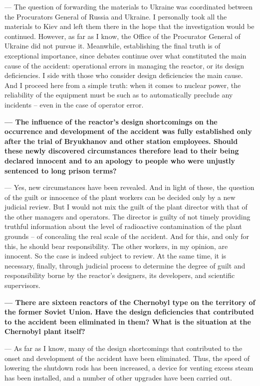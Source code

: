 \documentclass[openright]{bookest}
\begin{document}
\noindent
--- The question of forwarding the materials to Ukraine was coordinated between the Procurators General of Russia and Ukraine. I personally took all the materials to Kiev and left them there in the hope that the investigation would be continued. However, as far as I know, the Office of the Procurator General of Ukraine did not pursue it. Meanwhile, establishing the final truth is of exceptional importance, since debates continue over what constituted the main cause of the accident: operational errors in managing the reactor, or its design deficiencies. I side with those who consider design deficiencies the main cause. And I proceed here from a simple truth: when it comes to nuclear power, the reliability of the equipment must be such as to automatically preclude any incidents -- even in the case of operator error.

\medskip

\textbf{--- The influence of the reactor's design shortcomings on the occurrence and development of the accident was fully established only after the trial of Bryukhanov and other station employees. Should these newly discovered circumstances therefore lead to their being declared innocent and to an apology to people who were unjustly sentenced to long prison terms?}

\noindent
--- Yes, new circumstances have been revealed. And in light of these, the question of the guilt or innocence of the plant workers can be decided only by a new judicial review. But I would not mix the guilt of the plant director with that of the other managers and operators. The director is guilty of not timely providing truthful information about the level of radioactive contamination of the plant grounds -- of concealing the real scale of the accident. And for this, and only for this, he should bear responsibility. The other workers, in my opinion, are innocent. So the case is indeed subject to review. At the same time, it is necessary, finally, through judicial process to determine the degree of guilt and responsibility borne by the reactor's designers, its developers, and scientific supervisors. 

\medskip

\textbf{--- There are sixteen reactors of the Chernobyl type on the territory of the former Soviet Union. Have the design deficiencies that contributed to the accident been eliminated in them? What is the situation at the Chernobyl plant itself?}

\noindent
--- As far as I know, many of the design shortcomings that contributed to the onset and development of the accident have been eliminated. Thus, the speed of lowering the shutdown rods has been increased, a device for venting excess steam has been installed, and a number of other upgrades have been carried out.
\end{document}
